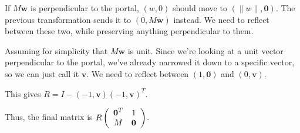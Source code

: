 If $M\textbf{w}$ is perpendicular to the portal, $(w,0)$ should move to $(\|w\|,\textbf{0})$. The previous transformation sends it to $(0,M\textbf{w})$ instead. We need to reflect between these two, while preserving anything perpendicular to them.

Assuming for simplicity that $M\textbf{w}$ is unit. Since we're looking at a unit vector perpendicular to the portal, we've already narrowed it down to a specific vector, so we can just call it $\textbf{v}$. We need to reflect between $(1,\textbf{0})$ and $(0,\textbf{v})$.

This gives $R = I - (-1,\textbf{v})(-1,\textbf{v})^T$.

Thus, the final matrix is $R\left(\begin{array}{ccc} \textbf{0}^T & 1 \\M & \textbf{0} \end{array} \right)$.